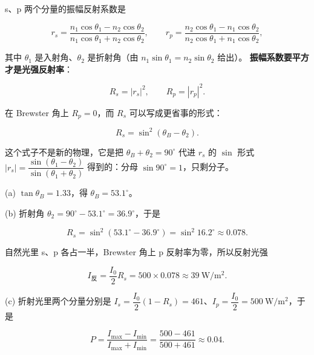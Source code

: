 \documentclass[11pt]{ctexart}
\begin{document}


s、p 两个分量的振幅反射系数是

\[
r_s=\frac{n_1\cos\theta_1-n_2\cos\theta_2}{n_1\cos\theta_1+n_2\cos\theta_2},
\qquad
r_p=\frac{n_2\cos\theta_1-n_1\cos\theta_2}{n_2\cos\theta_1+n_1\cos\theta_2},
\]

其中 $\theta_1$ 是入射角、$\theta_2$ 是折射角（由 $n_1\sin\theta_1=n_2\sin\theta_2$ 给出）。
\textbf{振幅系数要平方才是光强反射率}：

\[
R_s=|r_s|^2,\qquad R_p=|r_p|^2 .
\]

在 Brewster 角上 $R_p=0$，而 $R_s$ 可以写成更省事的形式：

\[
R_s=\sin^2(\theta_B-\theta_2).
\]

这个式子不是新的物理，它是把 $\theta_B+\theta_2=90^\circ$ 代进 $r_s$ 的 $\sin$ 形式
$\left|r_s\right|=\dfrac{\sin(\theta_1-\theta_2)}{\sin(\theta_1+\theta_2)}$ 得到的：分母 $\sin90^\circ=1$，只剩分子。


\qbreak
{}

(a) $\tan\theta_B=1.33$，得 $\theta_B=53.1^\circ$。

(b) 折射角 $\theta_2=90^\circ-53.1^\circ=36.9^\circ$，于是

\[
R_s=\sin^2(53.1^\circ-36.9^\circ)=\sin^2 16.2^\circ\approx0.078 .
\]

自然光里 s、p 各占一半，Brewster 角上 p 反射率为零，所以反射光强

\[
I_{\text{反}}=\frac{I_0}{2}R_s=500\times0.078\approx39\ \mathrm{W/m^2}.
\]

(c) 折射光里两个分量分别是 $I_s=\dfrac{I_0}{2}(1-R_s)=461$、$I_p=\dfrac{I_0}{2}=500\ \mathrm{W/m^2}$，于是

\[
P=\frac{I_{\max}-I_{\min}}{I_{\max}+I_{\min}}
=\frac{500-461}{500+461}\approx0.04 .
\]
\end{document}
